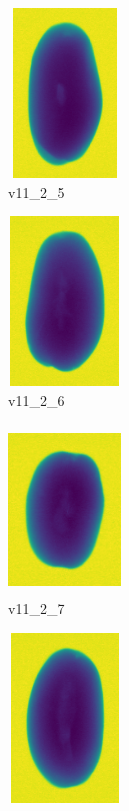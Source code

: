 \documentclass[11pt]{article}
\begin{document}
\begin{figure}
    
         \begin{subfigure}[b]{0.15\textwidth}
         \centering
         \includegraphics[width=3cm, height=4.5cm]{images/kartofler/v11_2_5_cut.png}
         \caption{v11\_2\_5}
         \label{fig:y equals x}
     \end{subfigure}
     \hfill
     \begin{subfigure}[b]{0.15\textwidth}
         \centering
         \includegraphics[width=3cm, height=4.5cm]{images/kartofler/v11_2_6_cut.png}
        \caption{v11\_2\_6}
         \label{fig:three sin x}
     \end{subfigure}
     \hfill
     \begin{subfigure}[b]{0.15\textwidth}
         \centering
         \includegraphics[width=3cm, height=4.5cm]{images/kartofler/v11_2_7_cut.png}
        \caption{v11\_2\_7}
         \label{fig:five over x}
     \end{subfigure}
     \hfill
    \begin{subfigure}[b]{0.15\textwidth}
         \centering
         \includegraphics[width=3cm, height=4.5cm]{images/kartofler/v11_2_8_cut.png}

\end{subfigure}
\end{figure}
\end{document}
